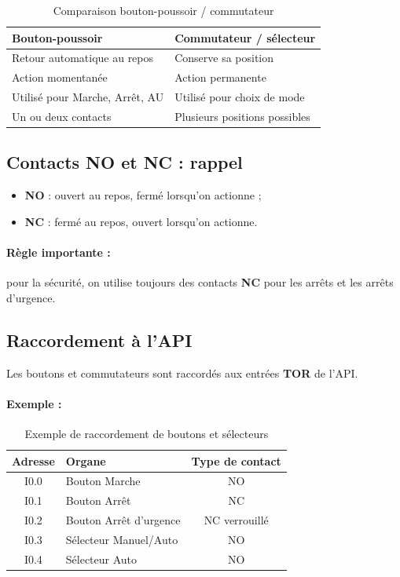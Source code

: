 \begin{table}[h]
\centering
\begin{tabularx}{\textwidth}{|X|X|}
\hline
\textbf{Bouton-poussoir} & \textbf{Commutateur / sélecteur} \\
\hline
Retour automatique au repos & Conserve sa position \\
\hline
Action momentanée & Action permanente \\
\hline
Utilisé pour Marche, Arrêt, AU & Utilisé pour choix de mode \\
\hline
Un ou deux contacts & Plusieurs positions possibles \\
\hline
\end{tabularx}
\caption{Comparaison bouton-poussoir / commutateur}
\end{table}

\subsection{Contacts NO et NC : rappel}

\begin{itemize}
    \item \textbf{NO} : ouvert au repos, fermé lorsqu'on actionne ;
    \item \textbf{NC} : fermé au repos, ouvert lorsqu'on actionne.
\end{itemize}

\paragraph{Règle importante :} pour la sécurité, on utilise toujours des contacts \textbf{NC} pour les arrêts et les arrêts d'urgence.

\subsection{Raccordement à l'API}

Les boutons et commutateurs sont raccordés aux entrées \textbf{TOR} de l'API.

\paragraph{Exemple :}

\begin{table}[h]
\centering
\begin{tabularx}{\textwidth}{|c|X|c|}
\hline
\textbf{Adresse} & \textbf{Organe} & \textbf{Type de contact} \\
\hline
I0.0 & Bouton Marche & NO \\
\hline
I0.1 & Bouton Arrêt & NC \\
\hline
I0.2 & Bouton Arrêt d'urgence & NC verrouillé \\
\hline
I0.3 & Sélecteur Manuel/Auto & NO \\
\hline
I0.4 & Sélecteur Auto & NO \\
\hline
\end{tabularx}
\caption{Exemple de raccordement de boutons et sélecteurs}
\end{table}

